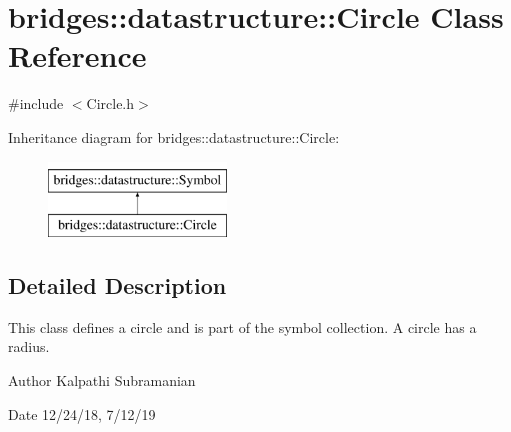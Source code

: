 \hypertarget{classbridges_1_1datastructure_1_1_circle}{}\section{bridges\+::datastructure\+::Circle Class Reference}
\label{classbridges_1_1datastructure_1_1_circle}


{\ttfamily \#include $<$Circle.\+h$>$}

Inheritance diagram for bridges\+::datastructure\+::Circle\+:\begin{figure}[H]
\begin{center}
\leavevmode
\includegraphics[height=2.000000cm]{classbridges_1_1datastructure_1_1_circle}
\end{center}
\end{figure}


\subsection{Detailed Description}
This class defines a circle and is part of the symbol collection. A circle has a radius. 

\begin{DoxyAuthor}{Author}
Kalpathi Subramanian 
\end{DoxyAuthor}
\begin{DoxyDate}{Date}
12/24/18, 7/12/19 
\end{DoxyDate}
